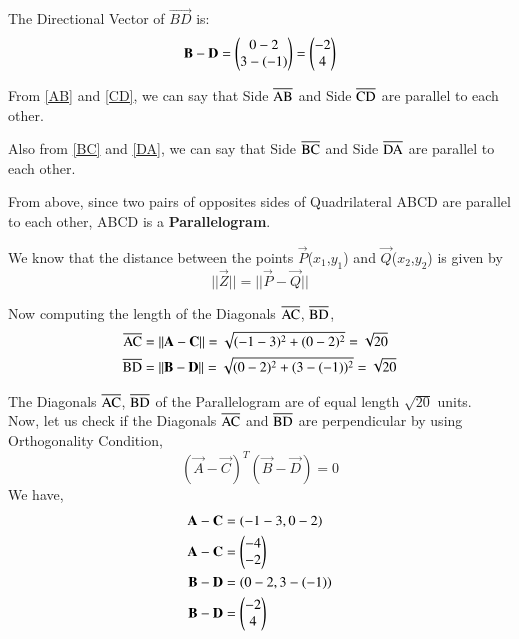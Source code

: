 \documentclass[journal,12pt,twocolumn]{IEEEtran}
\begin{document}
The Directional Vector of $\vec{BD}$ is:
\begin{equation}
    \vec{B} - \vec{D} = \myvec{0-2\\3-(-1)} = \myvec{-2\\4}
    \label{BD}
\end{equation}

From \eqref{AB} and \eqref{CD}, we can say that Side $\overline{\rm AB}$ and Side $\overline{\rm CD}$ are parallel to each other.

Also from \eqref{BC} and \eqref{DA}, we can say that Side $\overline{\rm BC}$ and Side $\overline{\rm DA}$ are parallel to each other.

From above, since two pairs of opposites sides of Quadrilateral ABCD are parallel to each other, ABCD is a \textbf{Parallelogram}.

We know that the distance between the points $\vec{P}$($x_1$,$y_1$) and $\vec{Q}$($x_2$,$y_2$) is given by
\begin{equation}
||\vec{Z}|| = ||\vec{P} - \vec{Q}||
\end{equation}

Now computing the length of the Diagonals $\overline{\rm AC}$, $\overline{\rm BD}$,
\begin{align}
    \overline{\rm AC} &= ||\vec{A} - \vec{C}|| = \sqrt{(-1-3)^2 + (0-2)^2} = \sqrt{20}\\
    \overline{\rm BD} &= ||\vec{B} - \vec{D}|| = \sqrt{(0-2)^2 + (3-(-1))^2} = \sqrt{20}
\end{align}

The Diagonals $\overline{\rm AC}$, $\overline{\rm BD}$ of the Parallelogram are of equal length $\sqrt{20}$ units.\\

Now, let us check if the Diagonals $\overline{\rm AC}$ and $\overline{\rm BD}$ are perpendicular by using Orthogonality Condition,
\begin{equation}
    (\vec{A} - \vec{C})^T(\vec{B} - \vec{D}) = 0
\end{equation}
We have,
\begin{align}
 \vec{A} - \vec{C} &= (-1-3, 0-2) \\
 \vec{A} - \vec{C} &= \myvec{-4\\-2} \\
 \vec{B} - \vec{D} &= (0-2, 3-(-1)) \\
 \vec{B} - \vec{D} &= \myvec{-2\\4}
\end{align}
\end{document}
